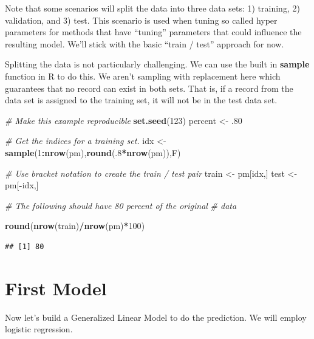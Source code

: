 \documentclass[
]{book}
\newenvironment{Shaded}{\begin{snugshade}}{\end{snugshade}}
\newcommand{\CommentTok}[1]{\textcolor[rgb]{0.56,0.35,0.01}{\textit{#1}}}
\newcommand{\DecValTok}[1]{\textcolor[rgb]{0.00,0.00,0.81}{#1}}
\newcommand{\FloatTok}[1]{\textcolor[rgb]{0.00,0.00,0.81}{#1}}
\newcommand{\KeywordTok}[1]{\textcolor[rgb]{0.13,0.29,0.53}{\textbf{#1}}}
\newcommand{\NormalTok}[1]{#1}
\newcommand{\OperatorTok}[1]{\textcolor[rgb]{0.81,0.36,0.00}{\textbf{#1}}}
\newcommand{\StringTok}[1]{\textcolor[rgb]{0.31,0.60,0.02}{#1}}
\begin{document}
Note that some scenarios will split the data into three data sets: 1) training, 2) validation, and 3) test. This scenario is used when tuning so called hyper parameters for methods that have ``tuning'' parameters that could influence the resulting model. We'll stick with the basic ``train / test'' approach for now.

Splitting the data is not particularly challenging. We can use the built in \textbf{sample} function in R to do this. We aren't sampling with replacement here which guarantees that no record can exist in both sets. That is, if a record from the data set is assigned to the training set, it will not be in the test data set.

\begin{Shaded}
\begin{Highlighting}[]
\CommentTok{# Make this example reproducible}
\KeywordTok{set.seed}\NormalTok{(}\DecValTok{123}\NormalTok{) }
\NormalTok{percent <-}\StringTok{ }\FloatTok{.80}

\CommentTok{# Get the indices for a training set.}
\NormalTok{idx <-}\StringTok{ }\KeywordTok{sample}\NormalTok{(}\DecValTok{1}\OperatorTok{:}\KeywordTok{nrow}\NormalTok{(pm),}\KeywordTok{round}\NormalTok{(.}\DecValTok{8}\OperatorTok{*}\KeywordTok{nrow}\NormalTok{(pm)),F)}

\CommentTok{# Use bracket notation to create the train / test pair}
\NormalTok{train <-}\StringTok{ }\NormalTok{pm[idx,]}
\NormalTok{test  <-}\StringTok{ }\NormalTok{pm[}\OperatorTok{-}\NormalTok{idx,]}

\CommentTok{# The following should have 80 percent of the original }
\CommentTok{# data}

\KeywordTok{round}\NormalTok{(}\KeywordTok{nrow}\NormalTok{(train)}\OperatorTok{/}\KeywordTok{nrow}\NormalTok{(pm)}\OperatorTok{*}\DecValTok{100}\NormalTok{)}
\end{Highlighting}
\end{Shaded}

\begin{verbatim}
## [1] 80
\end{verbatim}

\hypertarget{first-model}{%
\section{First Model}\label{first-model}}

Now let's build a Generalized Linear Model to do the prediction. We will employ logistic regression.
\end{document}

